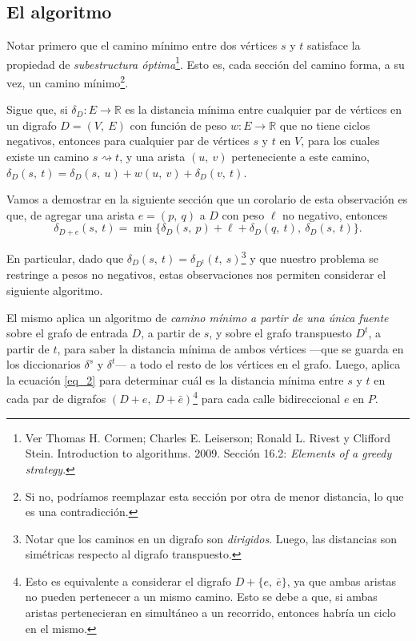 \subsection{El algoritmo}

Notar primero que el camino mínimo entre dos vértices $s$ y $t$ satisface la propiedad de \textit{subestructura óptima}\footnote{Ver Thomas H. Cormen; Charles E. Leiserson; Ronald L. Rivest y Clifford Stein. Introduction to algorithms.
2009. Sección 16.2: \textit{Elements of a greedy strategy}.}. Esto es, cada sección del camino forma, a su vez, un camino mínimo\footnote{Si no, podríamos reemplazar esta sección por otra de menor distancia, lo que es una contradicción.}. 

Sigue que, si $\delta_D : E \to \mathbb{R}$ es la distancia mínima entre cualquier par de vértices en un digrafo $D = (V,\ E)$ con función de peso $w: E \to \mathbb{R}$ que no tiene ciclos negativos, entonces para cualquier par de vértices $s$ y $t$ en $V$, para los cuales existe un camino $s \rightsquigarrow t$, y una arista $(u,\ v)$ perteneciente a este camino, $\delta_D(s,\ t) = \delta_D(s,\ u) + w(u,\ v) + \delta_D(v,\ t)$.

Vamos a demostrar en la siguiente sección que un corolario de esta observación es que, de agregar una arista $e = (p,\ q)$ a $D$ con peso $\ell$ no negativo, entonces 
\begin{equation}\label{eq_2}
    \delta_{D + e}(s,\ t) = \min\{\delta_{D}(s,\ p) + \ell + \delta_{D}(q,\ t),\ \delta_{D}(s,\ t)\}.
\end{equation}

En particular, dado que $\delta_D(s,\ t) = \delta_{D^t}(t,\ s)$\footnote{ Notar que los caminos en un digrafo son \textit{dirigidos}. Luego, las distancias son simétricas respecto al digrafo transpuesto.} y que nuestro problema se restringe a pesos no negativos, estas observaciones nos permiten considerar el siguiente algoritmo.



El mismo aplica un algoritmo de \textit{camino mínimo a partir de una  única fuente} sobre el grafo de entrada $D$, a partir de $s$, y sobre el grafo transpuesto $D^t$, a partir de $t$, para saber la distancia mínima de ambos vértices ---que se guarda en los diccionarios $\delta^s$ y $\delta^t$--- a todo el resto de los vértices en el grafo. Luego, aplica la ecuación \ref{eq_2} para determinar cuál es la distancia mínima entre $s$ y $t$ en cada par de digrafos $(D + e,\ D + \bar{e})$\footnote{Esto es equivalente a considerar el digrafo $D + \{e,\ \bar{e}\}$, ya que ambas aristas no pueden pertenecer a un mismo camino. Esto se debe a que, si ambas aristas pertenecieran en simultáneo a un recorrido, entonces habría un ciclo en el mismo.} para cada calle bidireccional $e$ en $P$.

